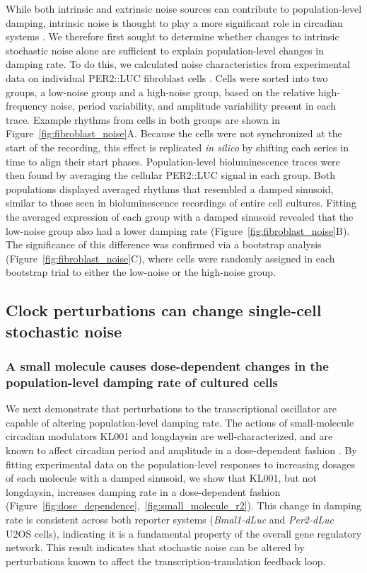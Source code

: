 \documentclass[11pt, letterpaper]{article}
\begin{document}
While both intrinsic and extrinsic noise sources can contribute to population-level damping, intrinsic noise is thought to play a more significant role in circadian systems \cite{Herzog2004}.
We therefore first sought to determine whether changes to intrinsic stochastic noise alone are sufficient to explain population-level changes in damping rate.
To do this, we calculated noise characteristics from experimental data on individual PER2::LUC fibroblast cells \cite{Leise2012}.
Cells were sorted into two groups, a low-noise group and a high-noise group, based on the relative high-frequency noise, period variability, and amplitude variability present in each trace.
Example rhythms from cells in both groups are shown in Figure~\ref{fig:fibroblast_noise}A.
Because the cells were not synchronized at the start of the recording, this effect is replicated {\itshape in silico} by shifting each series in time to align their start phases.
Population-level bioluminescence traces were then found by averaging the cellular PER2::LUC signal in each group.
Both populations displayed averaged rhythms that resembled a damped sinusoid, similar to those seen in bioluminescence recordings of entire cell cultures.
Fitting the averaged expression of each group with a damped sinusoid revealed that the low-noise group also had a lower damping rate (Figure~\ref{fig:fibroblast_noise}B).
The significance of this difference was confirmed via a bootstrap analysis (Figure~\ref{fig:fibroblast_noise}C), where cells were randomly assigned in each bootstrap trial to either the low-noise or the high-noise group.

\subsection*{Clock perturbations can change single-cell stochastic noise}

\subsubsection*{A small molecule causes dose-dependent changes in the population-level damping rate of cultured cells}

We next demonstrate that perturbations to the transcriptional oscillator are capable of altering population-level damping rate.
The actions of small-molecule circadian modulators KL001 and longdaysin are well-characterized, and are known to affect circadian period and amplitude in a dose-dependent fashion \cite{St.John2014}.
By fitting experimental data on the population-level responses to increasing dosages of each molecule with a damped sinusoid, we show that KL001, but not longdaysin, increases damping rate in a dose-dependent fashion (Figure~\ref{fig:dose_dependence},~\ref{fig:small_molecule_r2}).
This change in damping rate is consistent across both reporter systems ({\itshape Bmal1-dLuc} and {\itshape Per2-dLuc} U2OS cells), indicating it is a fundamental property of the overall gene regulatory network.
This result indicates that stochastic noise can be altered by perturbations known to affect the transcription-translation feedback loop.
\end{document}
